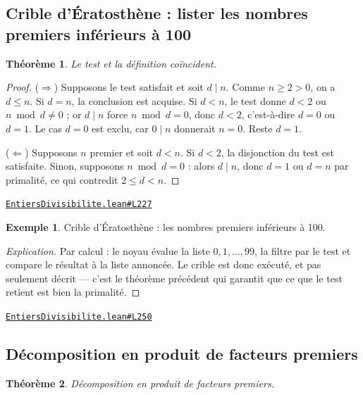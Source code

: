 \documentclass[11pt,a4paper]{article}
\theoremstyle{definition}
\newtheorem{exemple}{Exemple}
\theoremstyle{plain}
\newtheorem{theoreme}{Théorème}
\newenvironment{explication}{\begin{proof}[Explication]}{\end{proof}}
\newcommand{\source}[2]{\par\smallskip\noindent\hfill{\footnotesize\href{#1}{\texttt{#2}}}\par\smallskip}
\begin{document}
\subsection{Crible d'Ératosthène : lister les nombres premiers inférieurs à 100}

\begin{theoreme}
Le test et la définition coïncident.
\end{theoreme}

\begin{proof}
($\Rightarrow$) Supposons le test satisfait et soit $d \mid n$. Comme $n \ge 2 > 0$, on a
$d \le n$. Si $d = n$, la conclusion est acquise. Si $d < n$, le test donne $d < 2$ ou
$n \bmod d \ne 0$ ; or $d \mid n$ force $n \bmod d = 0$, donc $d < 2$, c'est-à-dire
$d = 0$ ou $d = 1$. Le cas $d = 0$ est exclu, car $0 \mid n$ donnerait $n = 0$. Reste
$d = 1$.

($\Leftarrow$) Supposons $n$ premier et soit $d < n$. Si $d < 2$, la disjonction du test
est satisfaite. Sinon, supposons $n \bmod d = 0$ : alors $d \mid n$, donc $d = 1$ ou
$d = n$ par primalité, ce qui contredit $2 \le d < n$.
\end{proof}
\source{https://github.com/Commutator-IO/learn-lean/blob/main/courses/01-college/01-nombres-et-calculs/EntiersDivisibilite.lean\#L227}{EntiersDivisibilite.lean\#L227}

\begin{exemple}
Crible d'Ératosthène : les nombres premiers inférieurs à 100.
\end{exemple}

\begin{explication}
Par calcul : le noyau évalue la liste $0, 1, \dots, 99$, la filtre par le test et compare
le résultat à la liste annoncée. Le crible est donc exécuté, et pas seulement décrit —
c'est le théorème précédent qui garantit que ce que le test retient est bien la
primalité.
\end{explication}
\source{https://github.com/Commutator-IO/learn-lean/blob/main/courses/01-college/01-nombres-et-calculs/EntiersDivisibilite.lean\#L250}{EntiersDivisibilite.lean\#L250}

\subsection{Décomposition en produit de facteurs premiers}

\begin{theoreme}
Décomposition en produit de facteurs premiers.
\end{theoreme}
\end{document}
